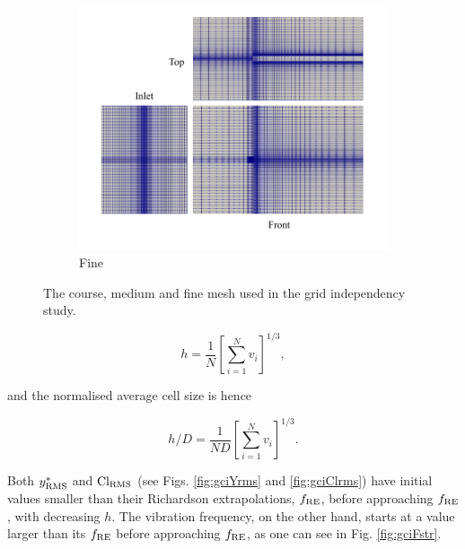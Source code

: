 \documentclass[oneside]{utmthesis}
\begin{document}
\begin{figure} \continuedfloat
  \centering
  \begin{subfigure}[h]{0.85\textwidth}
    \includegraphics[width=\textwidth]{figs/figure6c}
    \caption{Fine}
    \label{fig:fineMesh}
  \end{subfigure}

  \caption{The course, medium and fine mesh used in the grid independency study.} \label{fig:convergenceStudy}
\end{figure}

\begin{equation}
  h = \frac{1}{N} \left [ \sum_{i=1}^{N} v_{i} \right ]^{1/3},
  \label{eq:averageCellSize}
\end{equation}

\noindent and the normalised average cell size is hence 


\begin{equation}
  h/D = \frac{1}{ND} \left [ \sum_{i=1}^{N} v_{i} \right ]^{1/3}.
  \label{eq:normAveCellSize}
\end{equation}

\noindent Both $y^{*}_{\text{RMS}}$ and $\text{Cl}_{\text{RMS}}$ (see Figs. \ref{fig:gciYrms} and \ref{fig:gciClrms}) have initial values smaller than their Richardson extrapolations, $f_{\text{RE}}$, before approaching $f_{\text{RE}}$, with decreasing $h$. The vibration frequency, on the other hand, starts at a value larger than its $f_{\text{RE}}$ before approaching $f_{\text{RE}}$, as one can see in Fig. \ref{fig:gciFstr}.
\end{document}
